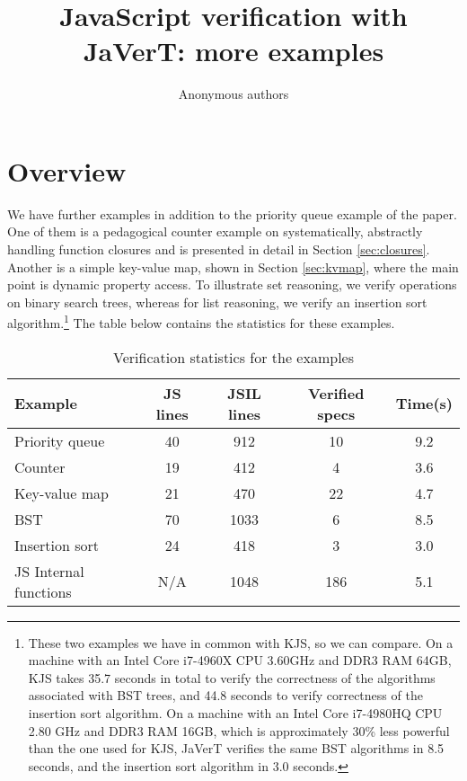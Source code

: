 \documentclass{article}
\newcounter{main}
\begin{document}
\title{JavaScript verification with JaVerT: more examples}
\author{Anonymous authors}

\maketitle


\section{Overview}

We have further examples in addition to the priority queue example of the paper. One of them is a pedagogical counter example on systematically, abstractly handling function closures and is presented in detail in Section \ref{sec:closures}. Another is a simple key-value map, shown in Section \ref{sec:kvmap}, where the main point is dynamic property access. To illustrate set reasoning, we verify operations on binary search trees, whereas for list reasoning, we verify an insertion sort algorithm.\footnote{These two examples we have in common with KJS, so we can compare. On a machine with an Intel Core i7-4960X CPU 3.60GHz and DDR3 RAM 64GB, KJS takes 35.7 seconds in total to verify the correctness of the algorithms associated with BST trees, and 44.8 seconds to verify correctness of the insertion sort algorithm. On a machine with an Intel Core i7-4980HQ CPU 2.80 GHz and DDR3 RAM 16GB, which is approximately 30\% less powerful than the one used for KJS, JaVerT verifies the same BST algorithms in 8.5 seconds, and the insertion sort algorithm in 3.0 seconds.} The table below contains the statistics for these examples.

\begin{table}[!h]
	\centering
    \begin{tabular}{|lcccc|}
    \hline
      \rowcolor{SkyBlue!40}
      {\bfseries Example} & {\bfseries JS lines} & {\bfseries JSIL lines} & {\bfseries Verified specs} & {\bfseries Time(s)} \\
      \hline
      Priority queue		&  40 &  912 &  10 & 9.2 \\
      Counter				&  19 &  412 &   4 & 3.6 \\ 
      Key-value map			&  21 &  470 &  22 & 4.7 \\
      BST					&  70 & 1033 &   6 & 8.5 \\
      Insertion sort		&  24 &  418 &   3 & 3.0 \\
      JS Internal functions & N/A & 1048 & 186 & 5.1 \\
      \hline
   \end{tabular}
  \caption{Verification statistics for the examples}
  \label{tab:stats}
\end{table}
\end{document}
